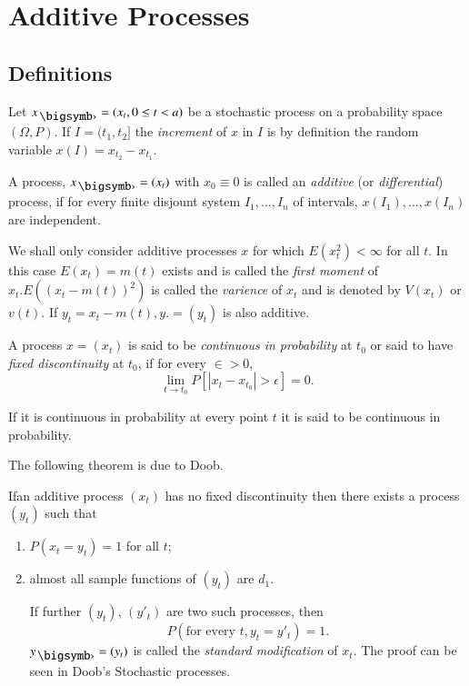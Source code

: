  \chapter{Additive Processes} %

\section{Definitions}\label{chap4-sec1}\pageoriginale

Let $x_{\bigdot}=(x_t,0 \leq t < a)$ be a stochastic process on a probability
space $(\Omega,P)$. If $I=(t_1,t_2]$ the \textit{increment} of $x$ in
      $I$ is by definition the random variable
      $x(I)=x_{t_2}-x_{t_1}$. 

\begin{defi*}
A process, $x_{\bigdot}=(x_{t})$ with $x_{0}\equiv 0$ is called an
{\em additive} (or {\em differential}) process,
if for every finite disjount system $I_1, \ldots,I_n$ of
  intervals, $x(I_1),\ldots,x(I_n)$ are independent. 
\end{defi*}

We shall only consider additive processes $x$ for which $E(x^2_t)<
\infty$ for all $t$. In this case $E(x_t)=m(t)$ exists and is called
the \textit{first moment} of $x_t. E((x_t-m(t))^2)$ is called the
\textit{varience} of $x_t$ and is denoted by $V(x_t)$ or $v(t)$. If
$y_t=x_t-m(t) , y . = (y_t)$ is also additive. 

\begin{defi*}
  A process $x=(x_t)$ is said to be {\em continuous in probability} at
  $t_0$ or said to have {\em fixed discontinuity} at $t_0$, if for
  every $\in >0$, 
  $$
  \lim_{t \to t_0} P[|x_t-x_{t_0}|> \epsilon]=0.
  $$

  If it is continuous in probability at every point $t$ it is said to
  be continuous in probability. 
\end{defi*}

The following theorem is due to Doob.
\setcounter{thm}{0}
\begin{thm}\label{chap4-sec1-thm1}%
  If\pageoriginale an additive process $(x_t)$ has no fixed
  discontinuity then there 
  exists a process $(y_t)$ such that 
  \begin{enumerate}
    \renewcommand{\labelenumi}{(\theenumi)}
    \item $P(x_t=y_t)=1$ for all $t$;

    \item almost all sample functions of $(y_t)$ are $d_1$.
    
    If further $(y_t)$, $(y'_t)$ are two such processes, then
  $$
  P(\text{for every\ } t , y_t = y'_t)=1.
  $$
  $y_{\bigdot}=(y_t)$ is called the {\em standard modification} of $x_t$. The
  proof can be seen in Doob's Stochastic processes. 
  \end{enumerate}
\end{thm}

